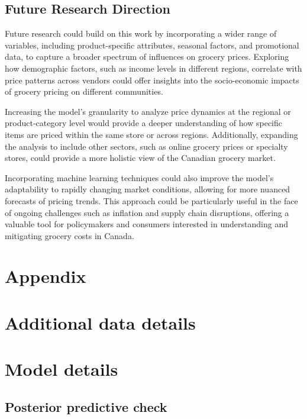 \documentclass[
  letterpaper,
  DIV=11,
  numbers=noendperiod]{scrartcl}
\begin{document}
\subsection{Future Research Direction}\label{future-research-direction}

Future research could build on this work by incorporating a wider range
of variables, including product-specific attributes, seasonal factors,
and promotional data, to capture a broader spectrum of influences on
grocery prices. Exploring how demographic factors, such as income levels
in different regions, correlate with price patterns across vendors could
offer insights into the socio-economic impacts of grocery pricing on
different communities.

Increasing the model's granularity to analyze price dynamics at the
regional or product-category level would provide a deeper understanding
of how specific items are priced within the same store or across
regions. Additionally, expanding the analysis to include other sectors,
such as online grocery prices or specialty stores, could provide a more
holistic view of the Canadian grocery market.

Incorporating machine learning techniques could also improve the model's
adaptability to rapidly changing market conditions, allowing for more
nuanced forecasts of pricing trends. This approach could be particularly
useful in the face of ongoing challenges such as inflation and supply
chain disruptions, offering a valuable tool for policymakers and
consumers interested in understanding and mitigating grocery costs in
Canada.

\newpage

\appendix

\section*{Appendix}\label{appendix}

\section{Additional data details}\label{additional-data-details}

\section{Model details}\label{sec-model-details}

\subsection{Posterior predictive
check}\label{posterior-predictive-check}
\end{document}
